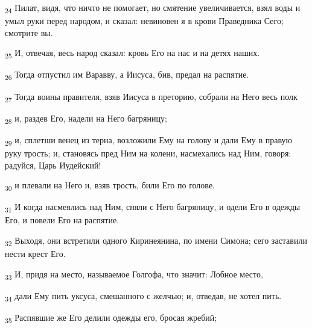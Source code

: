 \begin{tcolorbox}
\textsubscript{24} Пилат, видя, что ничто не помогает, но смятение увеличивается, взял воды и умыл руки перед народом, и сказал: невиновен я в крови Праведника Сего; смотрите вы.
\end{tcolorbox}
\begin{tcolorbox}
\textsubscript{25} И, отвечая, весь народ сказал: кровь Его на нас и на детях наших.
\end{tcolorbox}
\begin{tcolorbox}
\textsubscript{26} Тогда отпустил им Варавву, а Иисуса, бив, предал на распятие.
\end{tcolorbox}
\begin{tcolorbox}
\textsubscript{27} Тогда воины правителя, взяв Иисуса в преторию, собрали на Него весь полк
\end{tcolorbox}
\begin{tcolorbox}
\textsubscript{28} и, раздев Его, надели на Него багряницу;
\end{tcolorbox}
\begin{tcolorbox}
\textsubscript{29} и, сплетши венец из терна, возложили Ему на голову и дали Ему в правую руку трость; и, становясь пред Ним на колени, насмехались над Ним, говоря: радуйся, Царь Иудейский!
\end{tcolorbox}
\begin{tcolorbox}
\textsubscript{30} и плевали на Него и, взяв трость, били Его по голове.
\end{tcolorbox}
\begin{tcolorbox}
\textsubscript{31} И когда насмеялись над Ним, сняли с Него багряницу, и одели Его в одежды Его, и повели Его на распятие.
\end{tcolorbox}
\begin{tcolorbox}
\textsubscript{32} Выходя, они встретили одного Киринеянина, по имени Симона; сего заставили нести крест Его.
\end{tcolorbox}
\begin{tcolorbox}
\textsubscript{33} И, придя на место, называемое Голгофа, что значит: Лобное место,
\end{tcolorbox}
\begin{tcolorbox}
\textsubscript{34} дали Ему пить уксуса, смешанного с желчью; и, отведав, не хотел пить.
\end{tcolorbox}
\begin{tcolorbox}
\textsubscript{35} Распявшие же Его делили одежды его, бросая жребий;
\end{tcolorbox}
